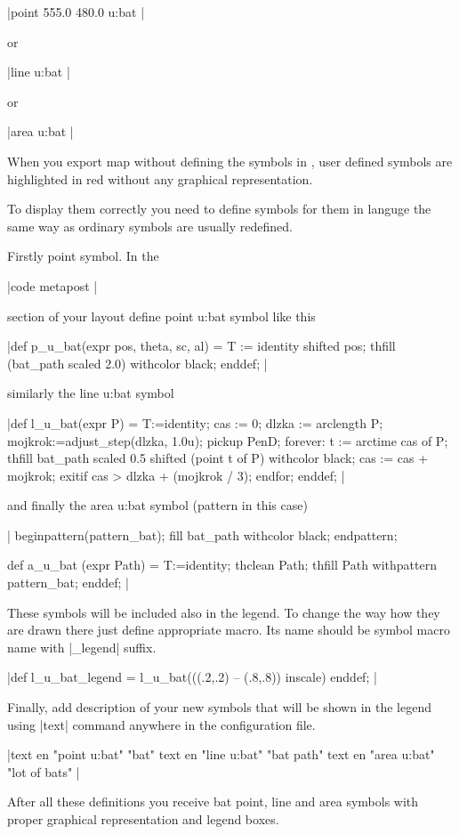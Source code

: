 |point 555.0 480.0 u:bat
|


 or


|line u:bat
|


 or


|area u:bat
|


 When you export map without defining the symbols in \MP{}, user defined symbols are highlighted
 in red without any graphical representation.







 To display them correctly you need to define symbols for them in
 \MP{} languge the same way as ordinary symbols are usually redefined.




 Firstly point symbol. In the


|code metapost
|


 section of your layout define point u:bat symbol like this


|def p_u_bat(expr pos, theta, sc, al) = 
  T := identity shifted pos;
  thfill (bat_path scaled 2.0) withcolor black;
enddef;
|


 similarly the line u:bat symbol


|def l_u_bat(expr P) =
  T:=identity;
  cas := 0;
  dlzka := arclength P;
  mojkrok:=adjust_step(dlzka, 1.0u);
  pickup PenD;
  forever:
    t := arctime cas of P;
    thfill bat_path scaled 0.5 shifted (point t of P) withcolor black;
    cas := cas + mojkrok;
    exitif cas > dlzka + (mojkrok / 3); %
  endfor;
enddef;
|


 and finally the area u:bat symbol (pattern in this case)


|%
beginpattern(pattern_bat);
    fill bat_path withcolor black;
endpattern;

def a_u_bat (expr Path) =
  T:=identity;
  thclean Path;
  thfill Path withpattern pattern_bat;
enddef;
|


 These symbols will be included also in the legend. To
 change the way how they are drawn there just define appropriate
 macro. Its name should be symbol macro name with |_legend| 
 suffix.


|def l_u_bat_legend = 
  l_u_bat(((.2,.2) -- (.8,.8)) inscale) 
enddef;
|


 Finally, add description of your new symbols that will be shown 
 in the legend using |text| command anywhere 
 in the configuration file.


|text en "point u:bat" "bat"
text en "line u:bat" "bat path"
text en "area u:bat" "lot of bats"
|


 After all these definitions you receive bat point, line and area symbols
 with proper graphical representation and legend boxes.






